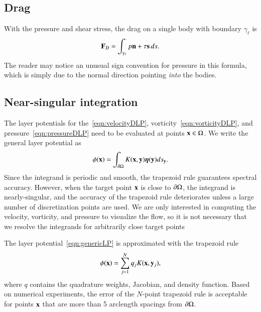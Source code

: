 \documentclass[preprint, 10pt]{elsarticle}
\begin{document}
\subsection{Drag}
\label{sec:drag}
With the pressure and shear stress, the drag on a single body with
boundary $\gamma_\ell$ is
\begin{align}
  \mathbf{F}_{D} = \int_{\gamma_\ell} p {\mathbf{n}} + \tau {\mathbf{s}} \,ds.
  \label{eqn:drag}
\end{align}
The reader may notice an unusual sign convention for pressure in this formula, which is simply due to the normal direction pointing {\em into} the bodies.

\subsection{Near-singular integration}
\label{sec:NSI}
The layer potentials for the~\eqref{eqn:velocityDLP},
vorticity~\eqref{eqn:vorticityDLP}, and pressure~\eqref{eqn:pressureDLP}
need to be evaluated at points ${\mathbf{x}} \in \Omega$. We write the general
layer potential as
\begin{align}
  \phi({\mathbf{x}}) = \int_{{\partial}\Omega} K({\mathbf{x}},{\mathbf{y}}) {\boldsymbol\eta}({\mathbf{y}}) ds_{\mathbf{y}}.
  \label{eqn:genericLP}
\end{align}
Since the integrand is periodic and smooth, the trapezoid rule
guarantees spectral accuracy.  However, when the target point ${\mathbf{x}}$ is
close to ${\partial}\Omega$, the integrand is nearly-singular, and the accuracy
of the trapezoid rule deteriorates unless a large number of
discretization points are used.  We are only interested in computing the
velocity, vorticity, and pressure to visualize the flow, so it is not
necessary that we resolve the integrands for arbitrarily close target
points

The layer potential~\eqref{eqn:genericLP} is approximated with the
trapezoid rule 
\begin{align}
  \phi({\mathbf{x}}) = \sum_{j=1}^N q_j K({\mathbf{x}},{\mathbf{y}}_j),
  \label{eqn:layerPotential}
\end{align}
where $q$ contains the quadrature weights, Jacobian, and density
function.  Based on numerical experiments, the error of the $N$-point
trapezoid rule is acceptable for points ${\mathbf{x}}$ that are more than 5
arclength spacings from ${\partial}\Omega$.
\end{document}
